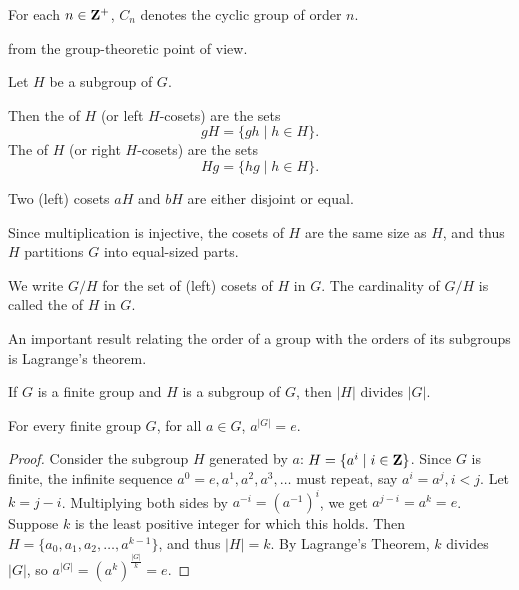 \begin{notation}
For each $n\in\mathbf Z^+$, $C_n$ denotes the cyclic group of order $n$.
\end{notation}






from the group-theoretic point of view.

\begin{definition}[Coset]
Let $H$ be a subgroup of $G$.

Then the  of $H$ (or left $H$-cosets) are the sets
\[ gH=\{gh\mid h\in H\}. \]
The  of $H$ (or right $H$-cosets) are the sets
\[ Hg=\{hg\mid h\in H\}. \]
\end{definition}

Two (left) cosets $aH$ and $bH$ are either disjoint or equal. 

Since multiplication is injective, the cosets of $H$ are the same size as $H$, and thus $H$ partitions $G$ into equal-sized parts.

\begin{notation}
We write $G/H$ for the set of (left) cosets of $H$ in $G$. The cardinality of $G/H$ is called the  of $H$ in $G$.
\end{notation}

An important result relating the order of a group with the orders of its subgroups is Lagrange's theorem.

\begin{theorem}
If $G$ is a finite group and $H$ is a subgroup of $G$, then $|H|$ divides $|G|$.
\end{theorem}

\begin{theorem}
For every finite group $G$, for all $a \in G$, $a^{|G|}=e$.
\end{theorem}

\begin{proof}
Consider the subgroup $H$ generated by $a$: $H = \{a^i \mid i \in \mathbf Z\}$. Since $G$ is finite, the infinite sequence $a^0=e, a^1, a^2, a^3, \dots$ must repeat, say $a^i = a^j, i < j$. Let $k=j-i$. Multiplying both sides by $a^{-i} = (a^{-1})^i$, we get $a^{j-i} = a^k = e$. Suppose $k$ is the least positive integer for which this holds. Then $H = \{a_0, a_1, a_2, \dots, a^{k-1}\}$, and thus $|H| = k$. By Lagrange’s Theorem, $k$ divides $|G|$, so $a^{|G|} = (a^k)^\frac{|G|}{k} = e$.
\end{proof}

